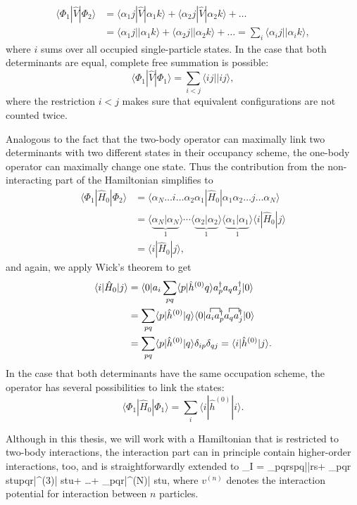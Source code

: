 \begin{align*}
\langle \Phi_1 | \hat{V}|\Phi_2\rangle  &= \langle \alpha_1 j |\hat{V}| \alpha_1 k \rangle + \langle \alpha_2 j |\hat{V}|\alpha_2 k \rangle + \dots \\
&= \langle \alpha_1 j || \alpha_1 k \rangle + \langle \alpha_2 j ||\alpha_2 k \rangle + \dots = \sum_i \langle \alpha_i j ||\alpha_i k \rangle,
\end{align*}
where $i$ sums over all occupied single-particle states. In the case that both determinants are equal, complete free summation is possible:
\[
\langle\Phi_1 | \hat{V}|\Phi_1\rangle = \sum_{i<j} \langle i j || i j \rangle,
\]
where the restriction $i<j$ makes sure that equivalent configurations are not counted twice.


Analogous to the fact that the two-body operator can maximally link two determinants with two different states in their occupancy scheme, the one-body operator can maximally change one state. Thus the contribution from the non-interacting part of the Hamiltonian simplifies to
\begin{align*}
\langle \Phi_1 | \hat{H}_0 | \Phi_2 \rangle &= \langle \alpha_N \dots  i \dots  \alpha_2\alpha_1 |\hat{H}_0 | \alpha_1 \alpha_2 \dots j \dots \alpha_N \rangle\\
&= \langle\underbrace{\alpha_N|\alpha_N}_1\rangle\cdots \langle\underbrace{\alpha_2|\alpha_2}_1\rangle\langle\underbrace{\alpha_1|\alpha_1}_1\rangle \langle i |\hat{H}_0|j\rangle\\
&= \langle i |\hat{H}_0|j\rangle,
\end{align*}
and again, we apply Wick's theorem to get
\begin{align*}
\langle i |\hat{H}_0|j\rangle
&= \langle 0 | a_i \sum_{pq} \langle p |\hat{h}^{(0)} q \rangle \ad_p a_q \ad_j | 0 \rangle \\
&= \sum_{pq} \langle p |\hat{h}^{(0)}|q\rangle \langle 0 | 
\contraction{}{a_i}{}{\ad_p}
\contraction{a_i\ad_p}{a_q}{}{\ad_j}
a_i \ad_p a_q \ad_j | 0 \rangle\\
&= \sum_{pq} \langle p | \hat{h}^{(0)} | q \rangle \delta_{ip}\delta_{qj} = \langle i | \hat{h}^{(0)} | j \rangle.
\end{align*}
In the case that both determinants have the same occupation scheme, the operator has several possibilities to link the states:
\[
\langle \Phi_1 | \hat{H}_0 | \Phi_1 \rangle = \sum_i \langle i |\hat{h}^{(0)}|i \rangle.
\]

Although in this thesis, we will work with a Hamiltonian that is restricted to two-body interactions, the interaction part can in principle contain higher-order interactions, too, and is straightforwardly extended to
\be 
{}_I = \sum_{pqrs}\langle pq||rs\rangle + \sum_{pqr\\stu}\langle pqr|^{(3)}| stu\rangle + \dots + \sum_{}\langle pqr\cdots |^{(N)}| \cdots stu\rangle,
\ee 
where $v^{(n)}$ denotes the interaction potential for interaction between $n$ particles.

